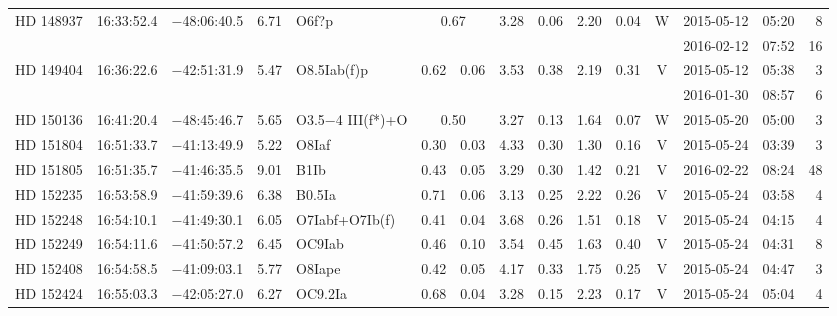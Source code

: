 \begin{tiny}
\begin{longtable}{lrrrll@{$\,\pm$\,}rl@{$\,\pm$\,}rl@{$\,\pm$\,}rcrrr}
HD 148937     &16:33:52.4&  $-$48:06:40.5&        6.71&  O6f?p &\multicolumn{2}{c}{0.67}&    3.28 & 0.06 &      2.20 & 0.04 &    W  &2015-05-12 &05:20&    8\\  %
              &          &               &            &                 & \multicolumn{6}{c}{}                              &       &2016-02-12 &07:52&   16\\  %
HD 149404     &16:36:22.6&  $-$42:51:31.9&        5.47&  O8.5Iab(f)p    & 0.62 & 0.06   &    3.53 & 0.38 &      2.19 & 0.31 &    V  &2015-05-12 &05:38&    3\\  %
              &          &               &            &                 & \multicolumn{6}{c}{}                              &       &2016-01-30 &08:57&    6\\  %
HD 150136     &16:41:20.4&  $-$48:45:46.7&        5.65&O3.5$-$4 III(f*)+O&\multicolumn{2}{c}{0.50}&3.27&0.13&   1.64 & 0.07 &    W  &2015-05-20 &05:00&    3\\  %
HD 151804     &16:51:33.7&  $-$41:13:49.9&        5.22&  O8Iaf          & 0.30 & 0.03   &    4.33 & 0.30 &      1.30 & 0.16 &    V  &2015-05-24 &03:39&    3\\  %
HD 151805     &16:51:35.7&  $-$41:46:35.5&        9.01&  B1Ib           & 0.43 & 0.05   &    3.29 & 0.30 &      1.42 & 0.21 &    V  &2016-02-22 &08:24&   48\\  %
HD 152235     &16:53:58.9&  $-$41:59:39.6&        6.38&  B0.5Ia         & 0.71 & 0.06   &    3.13 & 0.25 &      2.22 & 0.26 &    V  &2015-05-24 &03:58&    4\\  %
HD 152248     &16:54:10.1&  $-$41:49:30.1&        6.05&  O7Iabf+O7Ib(f) & 0.41 & 0.04   &    3.68 & 0.26 &      1.51 & 0.18 &    V  &2015-05-24 &04:15&    4\\  %
HD 152249     &16:54:11.6&  $-$41:50:57.2&        6.45&  OC9Iab         & 0.46 & 0.10   &    3.54 & 0.45 &      1.63 & 0.40 &    V  &2015-05-24 &04:31&    8\\  %
HD 152408     &16:54:58.5&  $-$41:09:03.1&        5.77&  O8Iape         & 0.42 & 0.05   &    4.17 & 0.33 &      1.75 & 0.25 &    V  &2015-05-24 &04:47&    3\\  %
HD 152424     &16:55:03.3&  $-$42:05:27.0&        6.27&  OC9.2Ia        & 0.68 & 0.04   &    3.28 & 0.15 &      2.23 & 0.17 &    V  &2015-05-24 &05:04&    4\\  %

\end{longtable}
\end{tiny}

